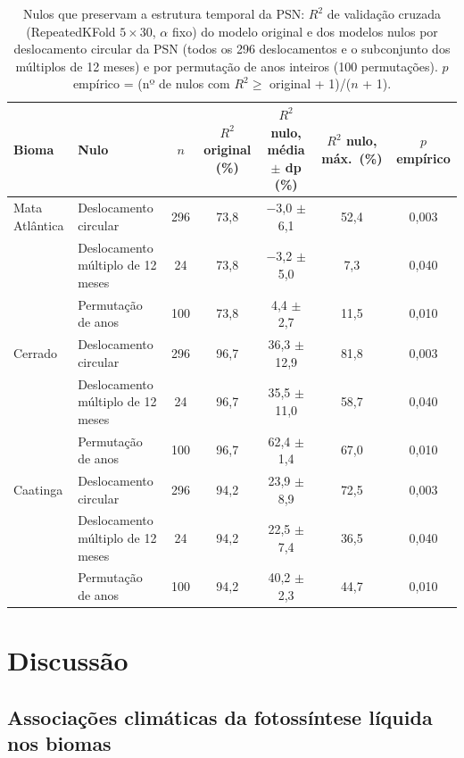 \documentclass[a4paper,fleqn]{cas-dc}
\begin{document}
\begin{table}[htbp]
\caption{Nulos que preservam a estrutura temporal da PSN: $R^2$ de validação cruzada (RepeatedKFold $5 \times 30$, $\alpha$ fixo) do modelo original e dos modelos nulos por deslocamento circular da PSN (todos os 296 deslocamentos e o subconjunto dos múltiplos de 12 meses) e por permutação de anos inteiros (100 permutações). $p$ empírico = (nº de nulos com $R^2 \ge$ original + 1)/($n$ + 1).}\label{tbl:nulls}
\footnotesize
\begin{tabular*}{\tblwidth}{@{}LLCCCCC@{}}
\toprule
Bioma & Nulo & $n$ & $R^2$ original (\%) & $R^2$ nulo, média $\pm$ dp (\%) & $R^2$ nulo, máx.\ (\%) & $p$ empírico \\
\midrule
Mata Atlântica & Deslocamento circular & 296 & 73,8 & $-$3,0 $\pm$ 6,1 & 52,4 & 0,003 \\
 & Deslocamento múltiplo de 12 meses & 24 & 73,8 & $-$3,2 $\pm$ 5,0 & 7,3 & 0,040 \\
 & Permutação de anos & 100 & 73,8 & 4,4 $\pm$ 2,7 & 11,5 & 0,010 \\
Cerrado & Deslocamento circular & 296 & 96,7 & 36,3 $\pm$ 12,9 & 81,8 & 0,003 \\
 & Deslocamento múltiplo de 12 meses & 24 & 96,7 & 35,5 $\pm$ 11,0 & 58,7 & 0,040 \\
 & Permutação de anos & 100 & 96,7 & 62,4 $\pm$ 1,4 & 67,0 & 0,010 \\
Caatinga & Deslocamento circular & 296 & 94,2 & 23,9 $\pm$ 8,9 & 72,5 & 0,003 \\
 & Deslocamento múltiplo de 12 meses & 24 & 94,2 & 22,5 $\pm$ 7,4 & 36,5 & 0,040 \\
 & Permutação de anos & 100 & 94,2 & 40,2 $\pm$ 2,3 & 44,7 & 0,010 \\
\bottomrule
\end{tabular*}
\end{table}

\section{Discussão}\label{sec:discussion}

\subsection{Associações climáticas da fotossíntese líquida nos biomas}
\end{document}
